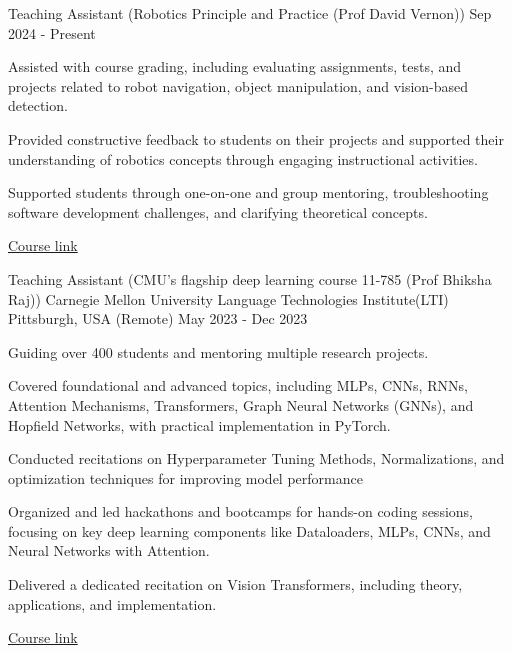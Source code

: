 \begin{cventries}
\cvExperience
  {Teaching Assistant (Robotics Principle and Practice (Prof David Vernon))} %
  {} %
  {} %
  {Sep 2024 - Present} %
  {
    \begin{cvitems} %
      \item {Assisted with course grading, including evaluating assignments, tests, and projects related to robot navigation, object manipulation, and vision-based detection.}
      \item {Provided constructive feedback to students on their projects and supported their understanding of robotics concepts through engaging instructional activities.}
      \item {Supported students through one-on-one and group mentoring, troubleshooting software development challenges, and clarifying theoretical concepts.}
    \end{cvitems}
    }
    {\href{http://www.vernon.eu/RPP.htm}{Course link}} %

	\cvExperience
	{Teaching Assistant (CMU's flagship deep learning course 11-785 (Prof Bhiksha Raj))} %
	{Carnegie Mellon University Language Technologies Institute(LTI)} %
	{Pittsburgh, USA (Remote)} %
	{May 2023 - Dec 2023} %
	{
		\begin{cvitems} %
			\item {Guiding over 400 students and mentoring multiple research projects.}
			\item {Covered foundational and advanced topics, including MLPs, CNNs, RNNs, Attention Mechanisms, Transformers, Graph Neural Networks (GNNs), and 
            Hopfield Networks, with practical implementation in PyTorch.}
			\item {Conducted recitations on Hyperparameter Tuning Methods, Normalizations, and optimization techniques for improving model performance}
			\item {Organized and led hackathons and bootcamps for hands-on coding sessions, focusing on key deep learning components like Dataloaders, 
      MLPs, CNNs, and Neural Networks with Attention.}
			\item {Delivered a dedicated recitation on Vision Transformers, including theory, applications, and implementation.}
		\end{cvitems}
	}
  {\href{https://deeplearning.cs.cmu.edu/F23/index.html}{Course link}} %

\end{cventries}
